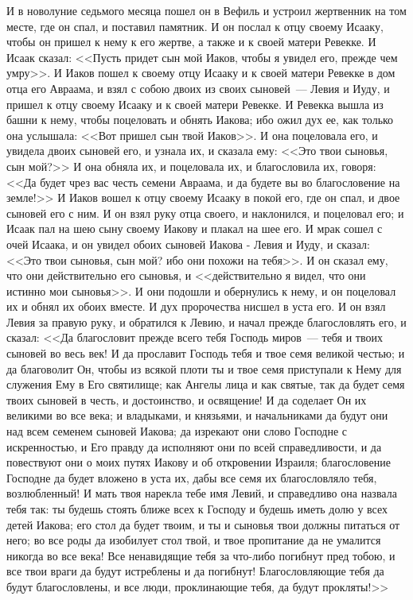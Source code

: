 И в новолуние седьмого месяца пошел он в Вефиль
и устроил жертвенник на том месте, где он спал, и
поставил памятник. И он послал к отцу своему
Исааку, чтобы он пришел к нему к его жертве, а
также и к своей матери Ревекке. И Исаак сказал:
<<Пусть придет сын мой Иаков, чтобы я увидел его,
прежде чем умру>>. И Иаков пошел к своему отцу
Исааку и к своей матери Ревекке в дом отца его
Авраама, и взял с собою двоих из своих сыновей~---
Левия и Иуду, и пришел к отцу своему Исааку и к
своей матери Ревекке. И Ревекка вышла из башни к
нему, чтобы поцеловать и обнять Иакова; ибо ожил
дух ее, как только она услышала: <<Вот пришел сын
твой Иаков>>. И она поцеловала его, и увидела
двоих сыновей его, и узнала их, и сказала ему:
<<Это твои сыновья, сын мой?>> И она обняла их, и
поцеловала их, и благословила их, говоря: <<Да
будет чрез вас честь семени Авраама, и да будете
вы во благословение на земле!>> И Иаков вошел к
отцу своему Исааку в покой его, где он спал, и двое
сыновей его с ним. И он взял руку отца своего, и
наклонился, и поцеловал его; и Исаак пал на шею
сыну своему Иакову и плакал на шее его. И мрак сошел
с очей Исаака, и он увидел обоих сыновей Иакова
- Левия и Иуду, и сказал: <<Это твои сыновья, сын
мой? ибо они похожи на тебя>>. И он сказал ему,
что они действительно его сыновья, и
<<действительно я видел, что они истинно мои
сыновья>>. И они подошли и обернулись к нему, и
он поцеловал их и обнял их обоих вместе. И дух
пророчества нисшел в уста его. И он взял Левия за
правую руку, и обратился к Левию, и начал прежде
благословлять его, и сказал: <<Да благословит
прежде всего тебя Господь миров~--- тебя и твоих
сыновей во весь век! И да прославит Господь тебя и
твое семя великой честью; и да благоволит Он,
чтобы из всякой плоти ты и твое семя приступали к
Нему для служения Ему в Его святилище; как Ангелы
лица и как святые, так да будет семя твоих сыновей
в честь, и достоинство, и освящение! И да соделает
Он их великими во все века; и владыками, и
князьями, и начальниками да будут они над всем
семенем сыновей Иакова; да изрекают они слово
Господне с искренностью, и Его правду да
исполняют они по всей справедливости, и да
повествуют они о моих путях Иакову и об
откровении Израиля; благословение Господне да
будет вложено в уста их, дабы все семя их
благословляло тебя, возлюбленный! И мать твоя
нарекла тебе имя Левий, и справедливо она назвала
тебя так: ты будешь стоять ближе всех к Господу и
будешь иметь долю у всех детей Иакова; его стол да
будет твоим, и ты и сыновья твои должны питаться
от него; во все роды да изобилует стол твой, и твое
пропитание да не умалится никогда во все века!
Все ненавидящие тебя за что-либо погибнут пред
тобою, и все твои враги да будут истреблены и да
погибнут! Благословляющие тебя да будут
благословлены, и все люди, проклинающие тебя, да
будут прокляты!>>

